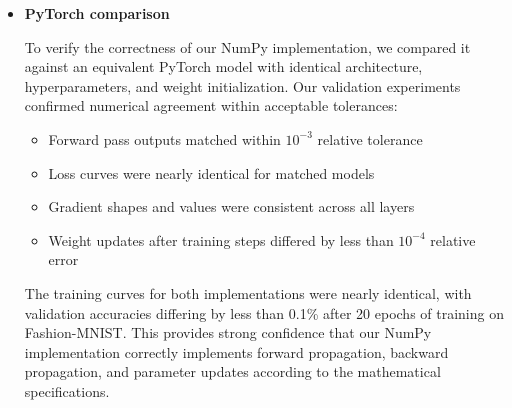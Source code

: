 \begin{itemize}
\begin{enumerate}
        \item \textbf{Tuning highly sensitive to learning rate and regularization}: Small changes in learning rate (e.g., 0.001 vs 0.003) or L2 lambda (e.g., 0.0001 vs 0.003) resulted in significant performance differences. This emphasizes the importance of systematic hyperparameter search using Bayesian optimization.
        
        \item \textbf{Adam offering fastest convergence}: Adam provided more stable convergence and faster training across both datasets, while SGD required careful learning rate tuning to match performance. RMSprop and Momentum provided intermediate performance.
        
        \item \textbf{Importance of matching initialization to activation}: Xavier initialization worked best with tanh, while He initialization was optimal for ReLU, confirming theoretical expectations. Mismatched pairs led to slower convergence and lower final accuracy.
        
        \item \textbf{Regularization crucial for preventing overfitting}: Both L2 weight decay and dropout were essential, especially on CIFAR-10. Optimal regularization strengths were dataset-dependent, with CIFAR-10 requiring substantially higher L2 values (0.002-0.005) compared to Fashion-MNIST (0.0001).
    \end{enumerate}
    
    \item \textbf{PyTorch comparison}
    
    To verify the correctness of our NumPy implementation, we compared it against an equivalent PyTorch model with identical architecture, hyperparameters, and weight initialization. Our validation experiments confirmed numerical agreement within acceptable tolerances:
    
    \begin{itemize}
        \item Forward pass outputs matched within $10^{-3}$ relative tolerance
        \item Loss curves were nearly identical for matched models
        \item Gradient shapes and values were consistent across all layers
        \item Weight updates after training steps differed by less than $10^{-4}$ relative error
    \end{itemize}
    
    The training curves for both implementations were nearly identical, with validation accuracies differing by less than 0.1\% after 20 epochs of training on Fashion-MNIST. This provides strong confidence that our NumPy implementation correctly implements forward propagation, backward propagation, and parameter updates according to the mathematical specifications.
\end{itemize}

